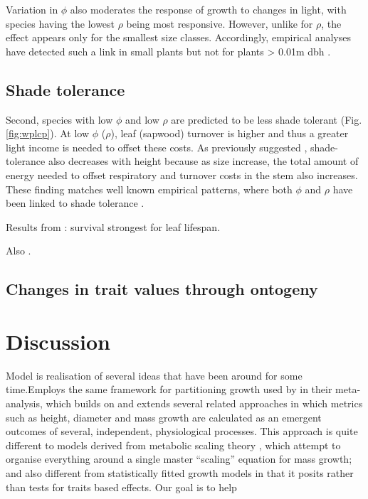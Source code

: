 \documentclass[a4paper,11pt]{article}
\begin{document}
Variation in $\phi$ also moderates the response of growth to changes in light, with species having the lowest $\rho$ being most responsive. However, unlike for $\rho$, the effect appears only for the smallest size classes. Accordingly, empirical analyses have detected such a link in small plants but not for plants \textgreater{} 0.01m dbh \citep{Ruger-2012}.


\subsection{Shade tolerance}



Second, species with low $\phi$ and low $\rho$ are predicted to be less shade tolerant (Fig. \ref{fig:wplcp}). At low $\phi$ ($\rho$), leaf (sapwood) turnover is higher and thus a greater light income is needed to offset these costs. As previously suggested \citep{Givnish-1988}, shade-tolerance also decreases with height because as size increase, the total amount of energy needed to offset respiratory and turnover costs in the stem also increases. These finding matches well known empirical patterns, where both $\phi$ and $\rho$ have been linked to shade tolerance \citep{Poorter-2006, Lusk-2008,Osunkoya-1996}.

Results from \citet{Poorter-2006}: survival strongest for leaf lifespan.

Also \citep{Baltzer-2007}.

\subsection{Changes in trait values through ontogeny}

\section{Discussion}


Model is realisation of several ideas that have been around for some
time.Employs the same framework for partitioning growth used by \citet{Gibert-2016} in their meta-analysis, which builds on and extends several related approaches \citep{Givnish-1988, Yokozawa-1995, Makela-1997, Moorcroft-2001, Falster-2011, King-2011} in which metrics such as height, diameter and mass growth are calculated as an emergent outcomes of several, independent, physiological processes. This approach is quite different to models derived from metabolic scaling theory \citep{Enquist-1999, Enquist-2007}, which attempt to organise everything around a single master ``scaling'' equation for mass growth; and also different from statistically fitted growth models \citep[e.g.][]{Herault-2011, Ruger-2012, Iida-2014} in that it posits rather than tests for traits based effects. Our goal is to help 
\end{document}
